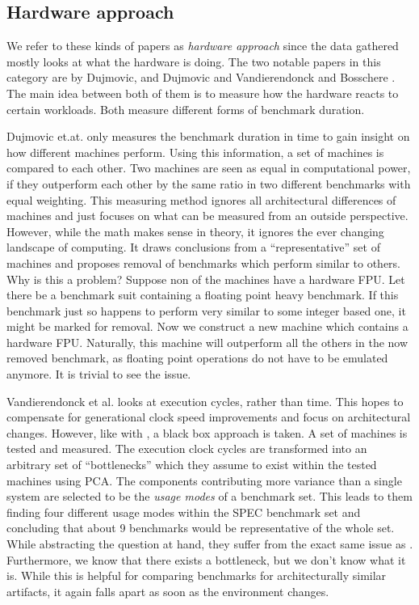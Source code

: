 \documentclass[../bachelor_paper.tex]{subfiles}
\begin{document}
\subsection{Hardware approach}
	\label{ch:theo/simi/hard}
We refer to these kinds of papers as \textit{hardware approach} since the data gathered mostly looks at what the hardware is doing. The two notable papers in this category are by Dujmovic, and Dujmovic \cite{dujmovicEvolutionEvaluationSPEC1998} and Vandierendonck and Bosschere \cite{vandierendonckManyBenchmarksStress}. The main idea between both of them is to measure how the hardware reacts to certain workloads. Both measure different forms of benchmark duration. 

Dujmovic et.at. \cite{dujmovicEvolutionEvaluationSPEC1998} only measures the benchmark duration in time to gain insight on how different machines perform. Using this information, a set of machines is compared to each other. Two machines are seen as equal in computational power, if they outperform each other by the same ratio in two different benchmarks with equal weighting. This measuring method ignores all architectural differences of machines and just focuses on what can be measured from an outside perspective.\\
However, while the math makes sense in theory, it ignores the ever changing landscape of computing. It draws conclusions from a ``representative'' set of machines and proposes removal of benchmarks which perform similar to others. Why is this a problem? Suppose non of the machines have a hardware \ac{FPU}. Let there be a benchmark suit containing a floating point heavy benchmark. If this benchmark just so happens to perform very similar to some integer based one, it might be marked for removal. Now we construct a new machine which contains a hardware \ac{FPU}. Naturally, this machine will outperform all the others in the now removed benchmark, as floating point operations do not have to be emulated anymore. It is trivial to see the issue.

Vandierendonck et al. \cite{vandierendonckManyBenchmarksStress} looks at execution cycles, rather than time. This hopes to compensate for generational clock speed improvements and focus on architectural changes. However, like with \cite{dujmovicEvolutionEvaluationSPEC1998}, a black box approach is taken. A set of machines is tested and measured. The execution clock cycles are transformed into an arbitrary set of ``bottlenecks'' which they assume to exist within the tested machines using \ac{PCA}. The components contributing more variance than a single system are selected to be the \textit{usage modes} of a benchmark set. This leads to them finding four different usage modes within the \ac{SPEC} benchmark set and concluding that about 9 benchmarks would be representative of the whole set.\\
While abstracting the question at hand, they suffer from the exact same issue as \cite{dujmovicEvolutionEvaluationSPEC1998}. Furthermore, we know that there exists a bottleneck, but we don't know what it is. While this is helpful for comparing benchmarks for architecturally similar artifacts, it again falls apart as soon as the environment changes.
\end{document}
